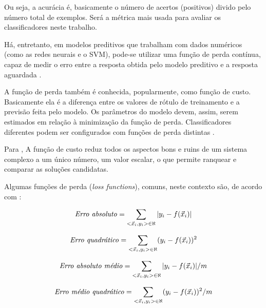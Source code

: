 Ou seja, a acurácia é, basicamente o número de acertos (positivos) divido pelo número total de exemplos. Será a métrica mais usada para avaliar os classificadores neste trabalho.

Há, entretanto, em modelos preditivos que trabalham com dados numéricos (como as redes neurais e o SVM), pode-se utilizar uma função de perda contínua, capaz de medir o erro entre a resposta obtida pelo modelo preditivo e a resposta aguardada \cite{Boscarioli2017, deep_learning_book_2019}.

A função de perda também é conhecida, popularmente, como função de custo. Basicamente ela é a diferença entre os valores de rótulo de treinamento e a previsão feita pelo modelo. Os parâmetros do modelo devem, assim, serem estimados em relação à minimização da função de perda. Classificadores diferentes podem ser configurados com funções de perda distintas  \cite{nn_smithing_1999, minewiskan_modelos_nodate, silva_redes_2016, Boscarioli2017, goldschmidt2005, geron_maos_2020, deep_learning_book_2019}.

Para , A função de custo reduz todos os aspectos bons e ruins de um sistema complexo a um único número, um valor escalar, o que permite ranquear e comparar as soluções candidatas.

Algumas funções de perda (\textit{loss functions}), comuns, neste contexto são, de acordo com :

\begin{equation}\label{erro_absoluto}
	\textrm{\textit{Erro absoluto}}=\sum_{<\vec{x}_i, y_i> \in \aleph} |y_i - f(\vec{x}_i)|
\end{equation}

\begin{equation}\label{erro_quadratico}
\textrm{\textit{Erro quadrático}}=\sum_{<\vec{x}_i, y_i> \in \aleph} (y_i - f(\vec{x}_i))^2
\end{equation}

\begin{equation}\label{erro_absoluto_medio}
\textrm{\textit{Erro absoluto médio}}=\sum_{<\vec{x}_i, y_i> \in \aleph} |y_i - f(\vec{x}_i)|/m
\end{equation}

\begin{equation}\label{erro_quadratico_medio}
\textrm{\textit{Erro médio quadrático}}=\sum_{<\vec{x}_i, y_i> \in \aleph} (y_i - f(\vec{x}_i))^2/m
\end{equation}

